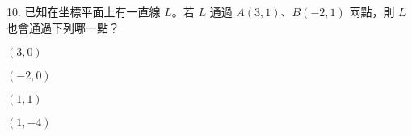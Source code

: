 \documentclass[12pt]{article}
\begin{document}
\begin{problem}[widest=10]
  \item[10.] 已知在坐標平面上有一直線 $L$。若 $L$ 通過 $A(3,1)$、$B(-2,1)$ 兩點，則 $L$ 也會通過下列哪一點？
  \begin{choices}
    \item $(3,0)$
    \item $(-2,0)$
    \item $(1,1)$
    \item $(1,-4)$
  \end{choices}
\end{problem}
\end{document}
